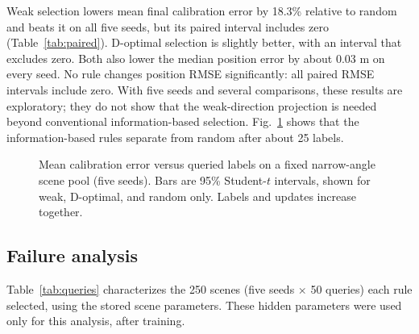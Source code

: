 \documentclass[conference]{IEEEtran}
\begin{document}
Weak selection lowers mean final calibration error by 18.3\% relative to random and beats it on all five seeds, but its paired interval includes zero (Table~\ref{tab:paired}). D-optimal selection is slightly better, with an interval that excludes zero. Both also lower the median position error by about 0.03 m on every seed. No rule changes position RMSE significantly: all paired RMSE intervals include zero. With five seeds and several comparisons, these results are exploratory; they do not show that the weak-direction projection is needed beyond conventional information-based selection. Fig.~\ref{fig:active} shows that the information-based rules separate from random after about 25 labels.

\begin{figure}[t]\centering
{}
\caption{Mean calibration error versus queried labels on a fixed narrow-angle scene pool (five seeds). Bars are 95\% Student-$t$ intervals, shown for weak, D-optimal, and random only. Labels and updates increase together.}\label{fig:active}
\end{figure}

\subsection{Failure analysis}
Table~\ref{tab:queries} characterizes the 250 scenes (five seeds $\times$ 50 queries) each rule selected, using the stored scene parameters. These hidden parameters were used only for this analysis, after training.
\end{document}
